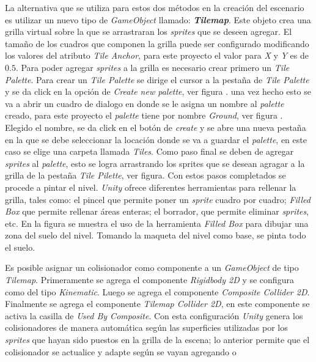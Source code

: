 La alternativa que se utiliza para estos dos métodos en la creación del 
escenario es utilizar un nuevo tipo de \textit{GameObject} llamado: 
\textit{\textbf{Tilemap}}. Este objeto crea una grilla virtual sobre la que se arrastraran los \textit{sprites} que se deseen agregar. El tamaño de los cuadros que componen la grilla puede ser configurado modificando los valores del atributo \textit{Tile Anchor}, para este proyecto el valor para \textit{X} y \textit{Y} es de $0.5$. Para poder agregar \textit{sprites} a la grilla es necesario crear primero un \textit{Tile Palette}. Para crear un \textit{Tile Palette} se dirige el cursor a la pestaña de \textit{Tile Palette} y se da click en la opción de \textit{Create new palette}, ver figura . una vez hecho esto se va a abrir un cuadro de dialogo en donde se le asigna un nombre al \textit{palette} creado, para este proyecto el \textit{palette} tiene por nombre \textit{Ground}, ver figura . Elegido el nombre, se da click en el botón de \textit{create} y se abre una nueva pestaña en la que se debe seleccionar la locación donde se va a guardar el \textit{palette}, en este caso se elige una carpeta llamada \textit{Tiles}. Como paso final se deben de agregar \textit{sprites} al \textit{palette}, esto se logra arrastrando los sprites que se desean agragar a la grilla de la pestaña \textit{Tile Pilette}, ver figura. Con estos pasos completados se procede a pintar el nivel. \textit{Unity} ofrece diferentes herramientas para rellenar la grilla, tales como: el pincel que permite poner un \textit{sprite} cuadro por cuadro; \textit{Filled Box} que permite rellenar áreas enteras; el borrador, que permite eliminar \textit{sprites}, etc. En la figura se muestra el uso de la herramienta \textit{Filled Box} para dibujar una zona del suelo del nivel. Tomando la maqueta del nivel como base, se pinta todo el suelo. 
\\
\par
Es posible asignar un colisionador como componente a un \textit{GameObject} de 
tipo \textit{Tilemap}. Primeramente se agrega el componente \textit{Rigidbody 
2D} y se configura como del tipo \textit{Kinematic}. Luego se agrega el 
componente \textit{Composite Collider 2D}. Finalmente se agrega el componente 
\textit{Tilemap Collider 2D}, en este componente se activa la casilla de 
\textit{Used By Composite}. Con esta configuración \textit{Unity} genera los 
colisionadores de manera automática según las superficies utilizadas por los 
\textit{sprites} que hayan sido puestos en la grilla de la escena; lo anterior 
permite que el colisionador se actualice y adapte según se vayan agregando o 

